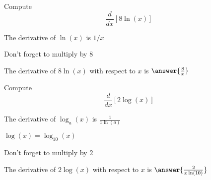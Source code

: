 \documentclass[handout]{ximera}
\begin{document}
\begin{problem} %
  Compute 
  \[
  \frac{d}{dx} \left[8\ln(x)\right]
  \]
  
    \begin{hint}
      The derivative of $\ln(x)$ is $1/x$
    \end{hint}
		\begin{hint}
		  Don't forget to multiply by $8$
		\end{hint}
		
		The derivative of $8\ln(x)$ with respect to $x$ is
		 $\answer{\frac{8}{x}}$
	
\end{problem}


\begin{problem} %
  Compute 
  \[
  \frac{d}{dx} \left[2\log(x)\right]
  \]
  
    \begin{hint}
      The derivative of $\log_a(x)$ is $\frac{1}{x\ln(a)}$
    \end{hint}
		\begin{hint}
		  $\log(x) = \log_10(x)$ 
		\end{hint}
		\begin{hint}
		  Don't forget to multiply by $2$
		\end{hint}
		
		The derivative of $2\log(x)$ with respect to $x$ is
		 $\answer{\frac{2}{x\ln(10)}}$
	
\end{problem}
\end{document}
